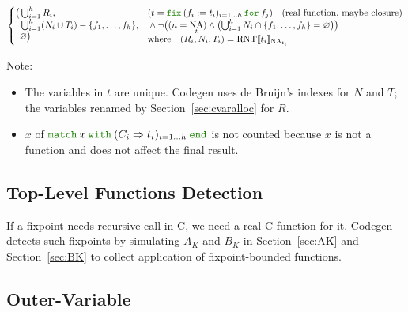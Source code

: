 \documentclass[a4paper,fleqn]{article}
\def\codegen{\textrm{Codegen}}
\newcommand{\kwmatch}{\mbox{\color{mygreen}\ttfamily match}}
\newcommand{\kwwith}{\mbox{\color{mygreen}\ttfamily with}}
\newcommand{\kwend}{\mbox{\color{mygreen}\ttfamily end}}
\newcommand{\kwfix}{\mbox{\color{mygreen}\ttfamily fix}}
\newcommand{\kwfor}{\mbox{\color{mygreen}\ttfamily for}}
\newcommand{\match}[4]{\kwmatch\:#1\:\kwwith\:(#2 \Rightarrow #3)_{#4}\:\kwend}
\newcommand{\fix}[4]{\kwfix\:(#1 := #2)_{#3}\:\kwfor\:#4}
\DeclareMathOperator{\NA}{NA} %
\newcommand{\BRA}[1]{\llbracket #1 \rrbracket}
\DeclareMathOperator{\RNTop}{RNT}
\newcommand{\RNT}[2]{\RNTop\BRA{#1}_{#2}}
\newcommand{\secref}[1]{Section~\ref{#1}}
\begin{document}
\begin{align*}
\begin{cases}
    \begin{aligned}[t]
      \bigl( & \textstyle\bigcup_{i=1}^h R_i, \\
             & \textstyle\bigcup_{i=1}^h (N_i \cup T_i) - \{f_1,\dotsc, f_h\}, \\
             & \varnothing \bigr)
    \end{aligned} &
      \begin{aligned}[t]
        & (t = \fix{f_i}{t_i}{i=1\ldots h}{f_j}) \quad \text{(real function, maybe closure)} \\
        & {} \wedge \neg \bigl((n = \NA_t) \wedge \bigl(\textstyle\bigcup_{i=1}^h N_i \cap \{f_1,\dotsc, f_h\} = \varnothing\bigr)\bigr) \\
        & \text{where}\quad (R_i, N_i, T_i) = \RNT{t_i}{\NA_{t_i}}
      \end{aligned}
  \end{cases}
\end{align*}
{\small Note:
\begin{itemize}
  \item The variables in $t$ are unique.
    \codegen{} uses de Bruijn's indexes for $N$ and $T$;
    the variables renamed by \secref{sec:cvaralloc} for $R$.
  \item $x$ of $\match{x}{C_i}{t_i}{i=1\ldots h}$ is not counted because $x$ is not a function and does not affect the final result.
\end{itemize}}

\subsection{Top-Level Functions Detection}\label{sec:top-level-function-detection}
If a fixpoint needs recursive call in C, we need a real C function for it.
\codegen{} detects such fixpoints by simulating $A_K$ and $B_K$ in \secref{sec:AK} and \secref{sec:BK} to collect application of fixpoint-bounded functions.

\subsection{Outer-Variable}\label{sec:outer-variable}
\end{document}
